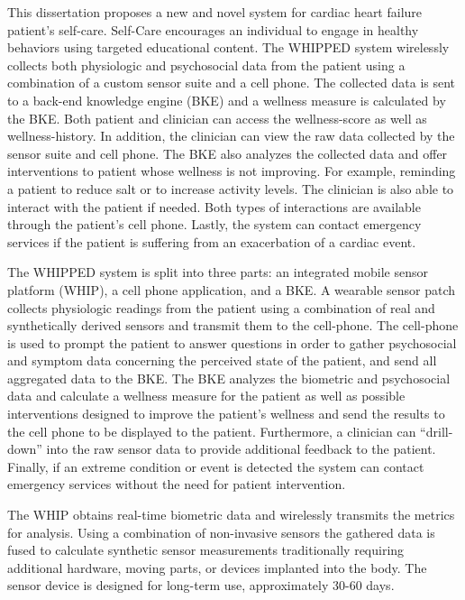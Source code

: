 This dissertation proposes a new and novel system for cardiac heart failure patient's self-care.  Self-Care encourages an individual to engage in healthy behaviors using targeted educational content. The WHIPPED system  wirelessly collects both physiologic and psychosocial data from the patient using a combination of a custom sensor suite and a cell phone. The collected data is sent to a back-end knowledge engine (BKE) and a wellness measure is calculated by the BKE. Both patient and clinician can access the wellness-score as well as wellness-history. In addition, the clinician  can view the raw data collected by the sensor suite and cell phone. The BKE also analyzes the collected data and offer interventions to patient whose wellness is not improving. For example, reminding a patient to reduce salt or to increase activity levels. The clinician is also able to interact with the patient if needed. Both types of interactions are available through the patient's cell phone. Lastly, the system can contact emergency services if the patient is suffering from an exacerbation of a cardiac event.  

The WHIPPED system is split into three parts: an integrated mobile sensor platform (WHIP), a cell phone application, and a BKE. A wearable sensor patch collects physiologic readings from the patient using a combination of real and synthetically derived sensors and transmit them to the cell-phone. The cell-phone is used to prompt the patient to answer questions in order to gather psychosocial and symptom data concerning the perceived state of the patient, and send all aggregated data to the BKE. The BKE analyzes the biometric and psychosocial data and calculate a wellness measure for the patient as well as possible interventions designed to improve the patient's wellness and send the results to the cell phone to be displayed to the patient. Furthermore, a clinician can “drill-down” into the raw sensor data to provide additional feedback to the patient. Finally, if an extreme condition or event is detected the system can contact emergency services without the need for patient intervention. 

The WHIP obtains real-time biometric data and wirelessly transmits the metrics for analysis. Using a combination of non-invasive sensors the gathered data is fused to calculate synthetic sensor measurements traditionally requiring additional hardware, moving parts, or devices implanted into the body. The sensor device is designed for long-term use, approximately 30-60 days.

